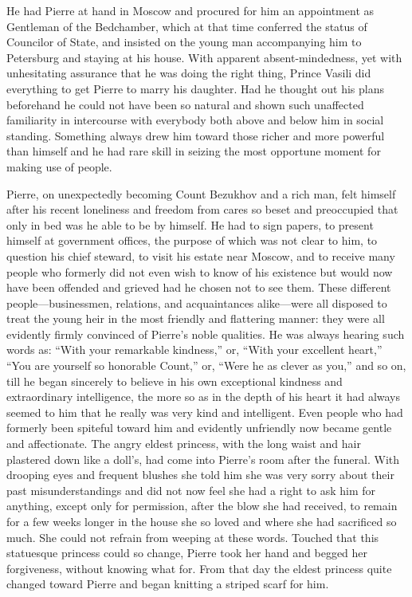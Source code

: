 He had Pierre at hand in Moscow and procured for him an
appointment as Gentleman of the Bedchamber, which at that time
conferred the status of Councilor of State, and insisted on the
young man accompanying him to Petersburg and staying at his
house. With apparent absent-mindedness, yet with unhesitating
assurance that he was doing the right thing, Prince Vasili did
everything to get Pierre to marry his daughter. Had he thought
out his plans beforehand he could not have been so natural and
shown such unaffected familiarity in intercourse with everybody
both above and below him in social standing. Something always
drew him toward those richer and more powerful than himself and
he had rare skill in seizing the most opportune moment for making
use of people.

Pierre, on unexpectedly becoming Count Bezukhov and a rich man,
felt himself after his recent loneliness and freedom from cares
so beset and preoccupied that only in bed was he able to be by
himself. He had to sign papers, to present himself at government
offices, the purpose of which was not clear to him, to question
his chief steward, to visit his estate near Moscow, and to
receive many people who formerly did not even wish to know of his
existence but would now have been offended and grieved had he
chosen not to see them. These different people---businessmen,
relations, and acquaintances alike---were all disposed to treat
the young heir in the most friendly and flattering manner: they
were all evidently firmly convinced of Pierre's noble
qualities. He was always hearing such words as: ``With your
remarkable kindness,'' or, ``With your excellent heart,'' ``You
are yourself so honorable Count,'' or, ``Were he as clever as
you,'' and so on, till he began sincerely to believe in his own
exceptional kindness and extraordinary intelligence, the more so
as in the depth of his heart it had always seemed to him that he
really was very kind and intelligent. Even people who had
formerly been spiteful toward him and evidently unfriendly now
became gentle and affectionate. The angry eldest princess, with
the long waist and hair plastered down like a doll's, had come
into Pierre's room after the funeral. With drooping eyes and
frequent blushes she told him she was very sorry about their past
misunderstandings and did not now feel she had a right to ask him
for anything, except only for permission, after the blow she had
received, to remain for a few weeks longer in the house she so
loved and where she had sacrificed so much. She could not refrain
from weeping at these words. Touched that this statuesque
princess could so change, Pierre took her hand and begged her
forgiveness, without knowing what for. From that day the eldest
princess quite changed toward Pierre and began knitting a striped
scarf for him.

